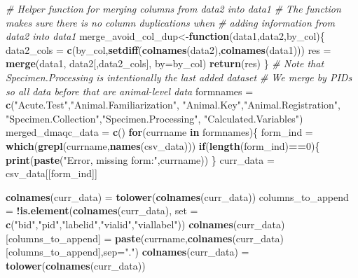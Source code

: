 \documentclass[]{article}
\newenvironment{Shaded}{\begin{snugshade}}{\end{snugshade}}
\newcommand{\KeywordTok}[1]{\textcolor[rgb]{0.13,0.29,0.53}{\textbf{#1}}}
\newcommand{\DataTypeTok}[1]{\textcolor[rgb]{0.13,0.29,0.53}{#1}}
\newcommand{\DecValTok}[1]{\textcolor[rgb]{0.00,0.00,0.81}{#1}}
\newcommand{\StringTok}[1]{\textcolor[rgb]{0.31,0.60,0.02}{#1}}
\newcommand{\CommentTok}[1]{\textcolor[rgb]{0.56,0.35,0.01}{\textit{#1}}}
\newcommand{\ControlFlowTok}[1]{\textcolor[rgb]{0.13,0.29,0.53}{\textbf{#1}}}
\newcommand{\OperatorTok}[1]{\textcolor[rgb]{0.81,0.36,0.00}{\textbf{#1}}}
\newcommand{\NormalTok}[1]{#1}
\begin{document}
\begin{Shaded}
\begin{Highlighting}[]
\CommentTok{# Helper function for merging columns from data2 into data1}
\CommentTok{# The function makes sure there is no column duplications when}
\CommentTok{# adding information from data2 into data1}
\NormalTok{merge_avoid_col_dup<-}\ControlFlowTok{function}\NormalTok{(data1,data2,by_col)\{}
\NormalTok{  data2_cols =}\StringTok{ }\KeywordTok{c}\NormalTok{(by_col,}\KeywordTok{setdiff}\NormalTok{(}\KeywordTok{colnames}\NormalTok{(data2),}\KeywordTok{colnames}\NormalTok{(data1)))}
\NormalTok{  res =}\StringTok{ }\KeywordTok{merge}\NormalTok{(data1, data2[,data2_cols], }\DataTypeTok{by=}\NormalTok{by_col)}
  \KeywordTok{return}\NormalTok{(res)}
\NormalTok{\}}
\CommentTok{# Note that Specimen.Processing is intentionally the last added dataset}
\CommentTok{# We merge by PIDs so all data before that are animal-level data}
\NormalTok{formnames =}\StringTok{ }\KeywordTok{c}\NormalTok{(}\StringTok{"Acute.Test"}\NormalTok{,}\StringTok{"Animal.Familiarization"}\NormalTok{,}
              \StringTok{"Animal.Key"}\NormalTok{,}\StringTok{"Animal.Registration"}\NormalTok{,}
              \StringTok{"Specimen.Collection"}\NormalTok{,}\StringTok{"Specimen.Processing"}\NormalTok{,}
              \StringTok{"Calculated.Variables"}\NormalTok{)}
\NormalTok{merged_dmaqc_data =}\StringTok{ }\KeywordTok{c}\NormalTok{()}
\ControlFlowTok{for}\NormalTok{(currname }\ControlFlowTok{in}\NormalTok{ formnames)\{}
\NormalTok{  form_ind =}\StringTok{ }\KeywordTok{which}\NormalTok{(}\KeywordTok{grepl}\NormalTok{(currname,}\KeywordTok{names}\NormalTok{(csv_data)))}
  \ControlFlowTok{if}\NormalTok{(}\KeywordTok{length}\NormalTok{(form_ind)}\OperatorTok{==}\DecValTok{0}\NormalTok{)\{}
    \KeywordTok{print}\NormalTok{(}\KeywordTok{paste}\NormalTok{(}\StringTok{"Error, missing form:"}\NormalTok{,currname))}
\NormalTok{  \}}
\NormalTok{  curr_data =}\StringTok{ }\NormalTok{csv_data[[form_ind]]}
  
  \KeywordTok{colnames}\NormalTok{(curr_data) =}\StringTok{ }\KeywordTok{tolower}\NormalTok{(}\KeywordTok{colnames}\NormalTok{(curr_data))}
\NormalTok{  columns_to_append =}\StringTok{ }\OperatorTok{!}\KeywordTok{is.element}\NormalTok{(}\KeywordTok{colnames}\NormalTok{(curr_data),}
              \DataTypeTok{set =} \KeywordTok{c}\NormalTok{(}\StringTok{"bid"}\NormalTok{,}\StringTok{"pid"}\NormalTok{,}\StringTok{"labelid"}\NormalTok{,}\StringTok{"vialid"}\NormalTok{,}\StringTok{"viallabel"}\NormalTok{))}
  \KeywordTok{colnames}\NormalTok{(curr_data)[columns_to_append] =}\StringTok{ }
\StringTok{    }\KeywordTok{paste}\NormalTok{(currname,}\KeywordTok{colnames}\NormalTok{(curr_data)[columns_to_append],}\DataTypeTok{sep=}\StringTok{"."}\NormalTok{)}
  \KeywordTok{colnames}\NormalTok{(curr_data) =}\StringTok{ }\KeywordTok{tolower}\NormalTok{(}\KeywordTok{colnames}\NormalTok{(curr_data))}


\end{Highlighting}
\end{Shaded}
\end{document}
